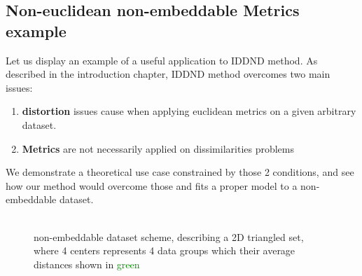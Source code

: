 \begin{}
	
\section{Non-euclidean non-embeddable Metrics example}

Let us display an example of a useful application to IDDND method.
As described in the introduction chapter{}, IDDND method overcomes two main issues:

\begin{enumerate}
	\item \textbf{distortion} issues cause when applying euclidean metrics on a given arbitrary dataset. 
	\item \textbf{Metrics} are not necessarily applied on dissimilarities problems
\end{enumerate}

We demonstrate a theoretical use case constrained by those 2 conditions, and see how our method would overcome those and fits a proper model to a non-embeddable dataset.
\\ \\ 
\newcommand{\centert}{2.66}

\begin{figure}[h]
	\centering

	
	\caption[triangle non-embeddable dataset]
	{non-embeddable dataset scheme, describing a 2D triangled set, where 4 centers represents 4 data groups which their average distances shown in \textcolor{green}{green}}
	

\end{figure}
\end{}
